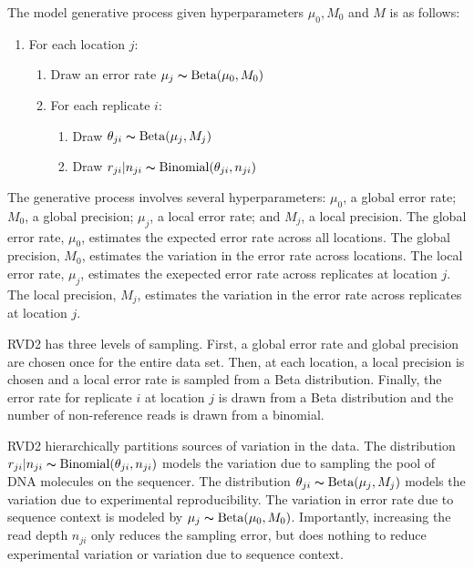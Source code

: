 \documentclass{bioinfo}
\begin{document}
The model generative process given hyperparameters $ \mu_0, M_0$ and $ M $ is as follows:

\begin{enumerate}[noitemsep]
	\item For each location $j$:
	\begin{enumerate}[noitemsep]
		\item Draw an error rate $\mu_j \thicksim \text{Beta}(\mu_0, M_0)$
		\item For each replicate $i$:
		\begin{enumerate}
			\item Draw $\theta_{ji} \thicksim \text{Beta}(\mu_j, M_j)$
			\item Draw $r_{ji}|n_{ji} \thicksim \text{Binomial}(\theta_{ji}, n_{ji})$
		\end{enumerate}
	\end{enumerate}
\end{enumerate}

The generative process involves several hyperparameters: $\mu_0$, a global error rate; $M_0$, a global precision;  $ \mu_j $, a local error rate; and $M_j$, a local precision. The global error rate, $\mu_0$, estimates the expected error rate across all locations. The global precision, $M_0$, estimates the variation in the error rate  across locations. The local error rate, $ \mu_j $, estimates the exepected error rate across replicates at location $ j $. The local precision, $M_j$, estimates the variation in the error rate across replicates at location $j$.

RVD2 has three levels of sampling. First, a global error rate and global precision are chosen once for the entire data set. Then, at each location, a local precision is chosen and a local error rate is sampled from a Beta distribution. Finally, the error rate for replicate $i$ at location $j$ is drawn from a Beta distribution and the number of non-reference reads is drawn from a binomial.

RVD2 hierarchically partitions sources of variation in the data. The distribution $r_{ji} | n_{ji} \thicksim \text{Binomial}(\theta_{ji}, n_{ji})$ models the variation due to sampling the pool of DNA molecules on the sequencer. The distribution $\theta_{ji} \thicksim \text{Beta}(\mu_j, M_j)$ models the variation due to experimental reproducibility. The variation in error rate due to sequence context is modeled by $\mu_j \thicksim \text{Beta}(\mu_0, M_0)$. Importantly, increasing the read depth $n_{ji}$ only reduces the sampling error, but does nothing to reduce experimental variation or variation due to sequence context.
\end{document}
